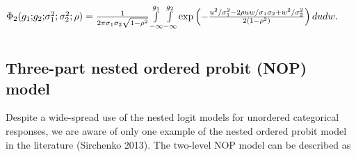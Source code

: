 \documentclass[letterpaper,fleqn,12pt]{article}
\begin{document}
\begin{center}
$\Phi _{2}(g_{1}\mathbf{;}g_{2}\mathbf{;}\sigma _{1}^{2};\sigma
_{2}^{2};\rho )=\frac{1}{2\pi \sigma _{1}\sigma _{2}\sqrt{1-\rho ^{2}}}%
\underset{}{\underset{-\infty }{\overset{g_{1}}{\int }}}\underset{-\infty }{%
\overset{g_{2}}{\int }}\exp \left( -\frac{u^{2}/\sigma _{1}^{2}-2\rho
uw/\sigma _{1}\sigma _{2}+w^{2}/\sigma _{2}^{2}}{2(1-\rho ^{2})}\right)
dudw. $
\end{center}

\subsection{Three-part nested ordered probit (NOP) model}

Despite a wide-spread use of the nested logit models for unordered
categorical responses, we are aware of only one example of the nested
ordered probit model in the literature (Sirchenko 2013). The two-level NOP
model can be described as

\bigskip
\end{document}
